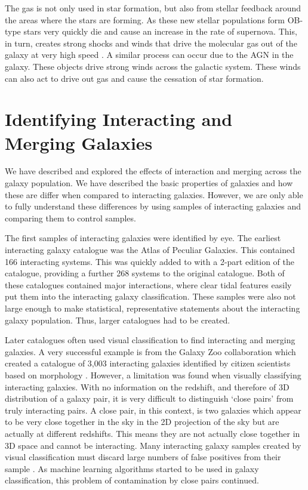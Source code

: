 The gas is not only used in star formation, but also from stellar feedback around the areas where the stars are forming. As these new stellar populations form OB-type stars very quickly die and cause an increase in the rate of supernova. This, in turn, creates strong shocks and winds that drive the molecular gas out of the galaxy at very high speed \citep{2013Natur.499..450B, 2018ApJ...864L...1G}. A similar process can occur due to the AGN in the galaxy. These objects drive strong winds across the galactic system. These winds can also act to drive out gas \citep{2014A&A...562A..21C, 2016Natur.533..504C, 2018MNRAS.480.3993B} and cause the cessation of star formation.

\section{Identifying Interacting and Merging Galaxies}
\noindent We have described and explored the effects of interaction and merging across the galaxy population. We have described the basic properties of galaxies and how these are differ when compared to interacting galaxies. However, we are only able to fully understand these differences by using samples of interacting galaxies and comparing them to control samples.

The first samples of interacting galaxies were identified by eye. The earliest interacting galaxy catalogue was the \citet{1966ApJS...14....1A} Atlas of Peculiar Galaxies. This contained 166 interacting systems. This was quickly added to with a 2-part edition of the \citet{1977A&AS...28....1V} catalogue, providing a further 268 systems to the original \citet{1966ApJS...14....1A} catalogue. Both of these catalogues contained major interactions, where clear tidal features easily put them into the interacting galaxy classification. These samples were also not large enough to make statistical, representative statements about the interacting galaxy population. Thus, larger catalogues had to be created.

Later catalogues often used visual classification to find interacting and merging galaxies. A very successful example is from the Galaxy Zoo collaboration which created a catalogue of 3,003 interacting galaxies identified by citizen scientists based on morphology \citep{2010MNRAS.401.1043D}. However, a limitation was found when visually classifying interacting galaxies. With no information on the redshift, and therefore of 3D distribution of a galaxy pair, it is very difficult to distinguish `close pairs' from truly interacting pairs. A close pair, in this context, is two galaxies which appear to be very close together in the sky in the 2D projection of the sky but are actually at different redshifts. This means they are not actually close together in 3D space and cannot be interacting. Many interacting galaxy samples created by visual classification must discard large numbers of false positives from their sample \citep{2020MNRAS.492.2075B, 2022A&A...661A..52P}. As machine learning algorithms started to be used in galaxy classification, this problem of contamination by close pairs continued.

